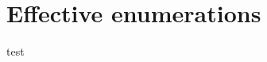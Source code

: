 \documentclass[class=article, crop=false]{standalone}
\begin{document}
\section{Effective enumerations}

test
\end{document}
